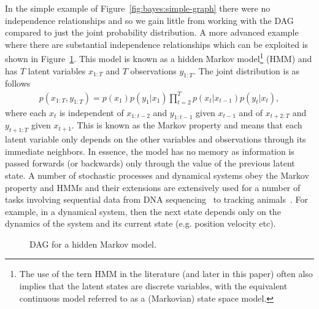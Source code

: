 In the simple example of Figure~\ref{fig:bayes:simple-graph} there were no independence relationships and so
we gain little from working with the DAG compared to just the joint probability distribution.
A more advanced example where there are substantial independence relationships which can
be exploited is shown in Figure~\ref{fig:bayes:hmm}.
  This model is known as a hidden Markov 
model\footnote{The use of the tern HMM in the literature (and later in this paper) often also implies that
	the latent states are discrete variables, with the equivalent continuous model referred to as a
	(Markovian) state space model.} (HMM)
and has $T$ latent variables $x_{1:T}$ and $T$ observations $y_{1:T}$.  The joint distribution is as follows
\begin{align}
\label{eq:bayes:hmm}
p(x_{1:T},y_{1:T}) = p(x_1) p(y_1|x_1)\prod_{t=2}^{T} p(x_t|x_{t-1})p(y_t|x_t),
\end{align}
where each $x_t$ is
independent of $x_{1:{t-2}}$ and $y_{1:t-1}$ given $x_{t-1}$ and of $x_{t+2:T}$ and $y_{{t+1}:T}$ given $x_{t+1}$.
This is known as the Markov property and means that each latent variable only depends on the other
variables and observations through its immediate neighbors.  In essence, the model has no memory as information
is passed forwards (or backwards) only through the value of the previous latent state.  A number of stochastic
processes and dynamical systems obey the Markov property and HMMs and their extensions are extensively used for
a number of tasks involving sequential data from DNA sequencing~\citep{durbin1998biological} to tracking
animals~\citep{dhir2016tracking,dhir2017interpreting}.  For example, in a dynamical system, then the next state
depends only on the dynamics of the system and its  current state (e.g. position velocity etc).

\begin{figure}[t]
	\centering 
	
	\caption{DAG for a hidden Markov model.
		\label{fig:bayes:hmm}}
\end{figure}


